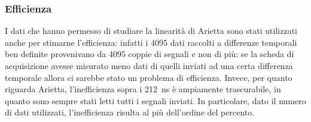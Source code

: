 \subsubsection{Efficienza}
I dati che hanno permesso di studiare la linearità di Arietta sono stati utilizzati anche per stimarne l'efficienza: infatti i 4095 dati raccolti a differenze temporali ben definite provenivano da  4095 coppie di segnali e non di più: se la scheda di acquisizione avesse misurato meno dati di quelli inviati ad una certa differenza temporale allora ci sarebbe stato un problema di efficienza. Invece, per quanto riguarda Arietta, l'inefficienza sopra i 212~ns è ampiamente trascurabile, in quanto sono sempre stati letti tutti i segnali inviati. In particolare, dato il  numero di  dati utilizzati, l'inefficienza risulta al più dell'ordine del percento.

